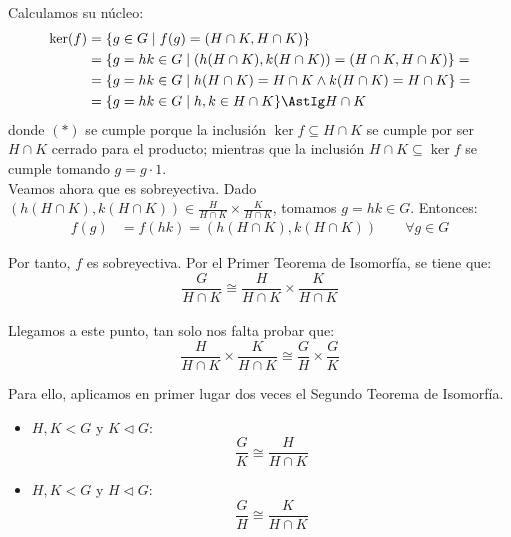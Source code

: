 \begin{ejercicio}
    Calculamos su núcleo:
    \begin{align*}
        \ker(f) &= \{g\in G\mid f(g)=(H\cap K,H\cap K)\}\\
        &= \{g=hk\in G\mid (h(H\cap K),k(H\cap K))=(H\cap K,H\cap K)\} =\\&= \{g=hk\in G\mid h(H\cap K)=H\cap K\wedge k(H\cap K)=H\cap K\} =\\&=
        \{g=hk\in G\mid h,k\in H\cap K\} \AstIg H\cap K
    \end{align*}
    donde $(\ast)$ se cumple porque la inclusión $\ker f \subseteq H\cap K$ se cumple por ser $H\cap K$ cerrado para el producto; mientras que la inclusión $H\cap K \subseteq \ker f$ se cumple tomando $g=g\cdot 1$.\\

    Veamos ahora que es sobreyectiva. Dado $(h(H\cap K),k(H\cap K))\in \frac{H}{H\cap K}\times \frac{K}{H\cap K}$, tomamos $g=hk\in G$. Entonces:
    \begin{align*}
        f(g) &= f(hk) = (h(H\cap K),k(H\cap K)) \qquad \forall g\in G
    \end{align*}

    Por tanto, $f$ es sobreyectiva. Por el Primer Teorema de Isomorfía, se tiene que:
    \begin{equation*}
        \frac{G}{H\cap K}\cong \frac{H}{H\cap K}\times \frac{K}{H\cap K}
    \end{equation*}~\\

    Llegamos a este punto, tan solo nos falta probar que:
    \begin{equation*}
        \frac{H}{H\cap K}\times \frac{K}{H\cap K}\cong \frac{G}{H}\times \frac{G}{K}
    \end{equation*}

    Para ello, aplicamos en primer lugar dos veces el Segundo Teorema de Isomorfía.
    \begin{itemize}
        \item $H,K<G$ y $K\lhd G$:
        \begin{equation*}
            \frac{G}{K}\cong \frac{H}{H\cap K}
        \end{equation*}

        \item $H,K<G$ y $H\lhd G$:
        \begin{equation*}
            \frac{G}{H}\cong \frac{K}{H\cap K}
        \end{equation*}
    \end{itemize}


\end{ejercicio}
